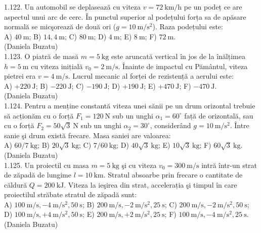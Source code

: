 1.122. Un automobil se deplasează cu viteza $v=72 \mathrm{~km} / \mathrm{h}$ pe un podeț ce are aspectul unui arc de cerc. În punctul superior al podețului forța sa de apăsare normală se micşorează de două ori ($g=10 \mathrm{~m} / \mathrm{s}^{2}$). Raza podețului este:\\ A) $40 \mathrm{~m}$; B) $14,4 \mathrm{~m}$; C) $80 \mathrm{~m}$; D) $4 \mathrm{~m}$; E) $8 \mathrm{~m}$; F) $72 \mathrm{~m}$.\\ (Daniela Buzatu)\\

1.123. O piatră de masă $m=5 \mathrm{~kg}$ este aruncată vertical în jos de la înălțimea $h=5 \mathrm{~m}$ cu viteza inițială $v_{0}=2 \mathrm{~m} / \mathrm{s}$. Înainte de impactul cu Pământul, viteza pietrei era $v=4 \mathrm{~m} / \mathrm{s}$. Lucrul mecanic al forței de rezistență a aerului este:\\ A) $+220 \mathrm{~J}$; B) $-220 \mathrm{~J}$; C) $-190 \mathrm{~J}$; D) $+190 \mathrm{~J}$; E) $+470 \mathrm{~J}$; F) $-470 \mathrm{~J}$.\\ (Daniela Buzatu)\\

1.124. Pentru a menține constantă viteza unei sănii pe un drum orizontal trebuie să acționăm cu o forță $F_{1}=120 \mathrm{~N}$ sub un unghi $\alpha_{1}=60^{\circ}$ față de orizontală, sau cu o forță $F_{2}=50 \sqrt{3} \mathrm{~N}$ sub un unghi $\alpha_{2}=30^{\circ}$, considerând $g=10 \mathrm{~m} / \mathrm{s}^{2}$. Între sanie şi drum există frecare. Masa saniei are valoarea:\\ A) $60 / 7 \mathrm{~kg}$; B) $20 \sqrt{3} \mathrm{~kg}$; C) $7 / 60 \mathrm{~kg}$; D) $40 \sqrt{3} \mathrm{~kg}$; E) $10 \sqrt{3} \mathrm{~kg}$; F) $60 \sqrt{3} \mathrm{~kg}$.\\ (Daniela Buzatu)\\

1.125. Un proiectil cu masa $m=5 \mathrm{~kg}$ şi cu viteza $v_{0}=300 \mathrm{~m} / \mathrm{s}$ intră într-un strat de zăpadă de lungime $l=10 \mathrm{~km}$. Stratul absoarbe prin frecare o cantitate de căldură $Q=200 \mathrm{~kJ}$. Viteza la ieşirea din strat, accelerația şi timpul în care proiectilul străbate stratul de zăpadă sunt:\\ A) $100 \mathrm{~m} / \mathrm{s}, -4 \mathrm{~m} / \mathrm{s}^{2}, 50 \mathrm{~s}$; B) $200 \mathrm{~m} / \mathrm{s}, -2 \mathrm{~m} / \mathrm{s}^{2}, 25 \mathrm{~s}$; C) $200 \mathrm{~m} / \mathrm{s}, -2 \mathrm{~m} / \mathrm{s}^{2}, 50 \mathrm{~s}$; D) $100 \mathrm{~m} / \mathrm{s}, +4 \mathrm{~m} / \mathrm{s}^{2}, 50 \mathrm{~s}$; E) $200 \mathrm{~m} / \mathrm{s}, +2 \mathrm{~m} / \mathrm{s}^{2}, 25 \mathrm{~s}$; F) $100 \mathrm{~m} / \mathrm{s}, -4 \mathrm{~m} / \mathrm{s}^{2}, 25 \mathrm{~s}$.\\ (Daniela Buzatu)\\

